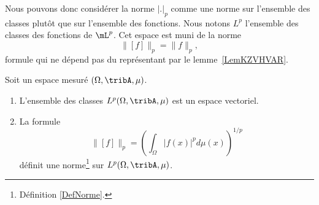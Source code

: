 Nous pouvons donc considérer la norme \( | . |_p\) comme une norme sur l'ensemble des classes plutôt que sur l'ensemble des fonctions. Nous notons \( L^p\) l'ensemble des classes des fonctions de \(\mL^p\). Cet espace est muni de la norme
\begin{equation}
	\| [f] \|_p=\| f \|_p,
\end{equation}
formule qui ne dépend pas du représentant par le lemme~\ref{LemKZVHVAR}.

\begin{proposition}     \label{PROPooTYCYooAKJWOX}
	Soit un espace mesuré \( (\Omega,\tribA,\mu)\).
	\begin{enumerate}
		\item
		      L'ensemble des classes \( L^p(\Omega,\tribA,\mu)\) est un espace vectoriel.
		\item
		      La formule
		      \begin{equation}
			      \| [f] \|_p=\left( \int_{\Omega}| f(x) |^pd\mu(x) \right)^{1/p}
		      \end{equation}
		      définit une norme\footnote{Définition \ref{DefNorme}.} sur \( L^p(\Omega,\tribA,\mu)\).
	\end{enumerate}
\end{proposition}


